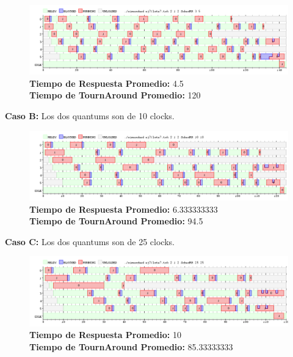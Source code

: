 \documentclass[a4paper]{article}
\begin{document}
		 \begin{figure}[h!]
   \begin{center}
 	\includegraphics[scale=0.5]{imagenes/ej7/2nucleoA.png}
 	\textbf{Tiempo de Respuesta Promedio:} 4.5 \\
 	\textbf{Tiempo de TournAround Promedio:} 120 \\
   \end{center}
 \end{figure} 
 	
	\textbf{Caso B:} Los dos quantums son de 10 clocks.

		 \begin{figure}[h!]
   \begin{center}
 	\includegraphics[scale=0.5]{imagenes/ej7/2nucleoB.png}
 	\textbf{Tiempo de Respuesta Promedio:} 6.333333333\\
 	\textbf{Tiempo de TournAround Promedio:} 94.5\\
   \end{center}
 \end{figure} 
 	
	\textbf{Caso C:} Los dos quantums son de 25 clocks.

		 \begin{figure}[h!]
   \begin{center}
 	\includegraphics[scale=0.5]{imagenes/ej7/2nucleoC.png}
 	\textbf{Tiempo de Respuesta Promedio:} 10 \\
 	\textbf{Tiempo de TournAround Promedio:} 85.33333333 \\
   \end{center}
 \end{figure} 
 
\end{document}
